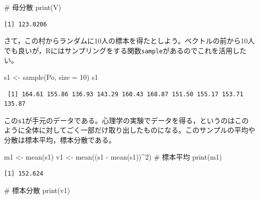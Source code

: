 \documentclass[
  a4paper,
]{ltjsbook}
\newenvironment{Shaded}{\begin{snugshade}}{\end{snugshade}}
\newcommand{\AttributeTok}[1]{\textcolor[rgb]{0.40,0.45,0.13}{#1}}
\newcommand{\CommentTok}[1]{\textcolor[rgb]{0.37,0.37,0.37}{#1}}
\newcommand{\DecValTok}[1]{\textcolor[rgb]{0.68,0.00,0.00}{#1}}
\newcommand{\FunctionTok}[1]{\textcolor[rgb]{0.28,0.35,0.67}{#1}}
\newcommand{\NormalTok}[1]{\textcolor[rgb]{0.00,0.23,0.31}{#1}}
\newcommand{\OtherTok}[1]{\textcolor[rgb]{0.00,0.23,0.31}{#1}}
\newcommand{\SpecialCharTok}[1]{\textcolor[rgb]{0.37,0.37,0.37}{#1}}
\begin{document}
\begin{Shaded}
\begin{Highlighting}[]
\CommentTok{\# 母分散}
\FunctionTok{print}\NormalTok{(V)}
\end{Highlighting}
\end{Shaded}

\begin{verbatim}
[1] 123.0206
\end{verbatim}

さて，この村からランダムに10人の標本を得たとしよう。ベクトルの前から10人でも良いが，Rにはサンプリングをする関数\texttt{sample}があるのでこれを活用したい。

\begin{Shaded}
\begin{Highlighting}[]
\NormalTok{s1 }\OtherTok{\textless{}{-}} \FunctionTok{sample}\NormalTok{(Po, }\AttributeTok{size =} \DecValTok{10}\NormalTok{)}
\NormalTok{s1}
\end{Highlighting}
\end{Shaded}

\begin{verbatim}
 [1] 164.61 155.86 136.93 143.29 160.43 168.87 151.50 155.17 153.71 135.87
\end{verbatim}

この\texttt{s1}が手元のデータである。心理学の実験でデータを得る，というのはこのように全体に対してごく一部だけ取り出したものになる。このサンプルの平均や分散は標本平均，標本分散である。

\begin{Shaded}
\begin{Highlighting}[]
\NormalTok{m1 }\OtherTok{\textless{}{-}} \FunctionTok{mean}\NormalTok{(s1)}
\NormalTok{v1 }\OtherTok{\textless{}{-}} \FunctionTok{mean}\NormalTok{((s1 }\SpecialCharTok{{-}} \FunctionTok{mean}\NormalTok{(s1))}\SpecialCharTok{\^{}}\DecValTok{2}\NormalTok{)}
\CommentTok{\# 標本平均}
\FunctionTok{print}\NormalTok{(m1)}
\end{Highlighting}
\end{Shaded}

\begin{verbatim}
[1] 152.624
\end{verbatim}

\begin{Shaded}
\begin{Highlighting}[]
\CommentTok{\# 標本分散}
\FunctionTok{print}\NormalTok{(v1)}
\end{Highlighting}
\end{Shaded}
\end{document}
